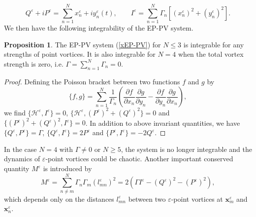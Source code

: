 \documentclass{article}
\theoremstyle{definition}
\newtheorem{proposition}[theorem]{Proposition}
\begin{document}
\begin{equation*}
Q^\varepsilon + i P^\varepsilon = \sum_{n = 1}^N x_n^\varepsilon + i y_n^\varepsilon(t), \qquad I^\varepsilon = \sum_{n = 1}^N \Gamma_n \left[ (x_n^\varepsilon)^2 + (y_n^\varepsilon)^2 \right].
\end{equation*}
We then have the following integrability of the EP-PV system.
\begin{proposition}
 The EP-PV system (\ref{xEP-PV}) for $N \leq 3$ is integrable for any strengths of point vortices. It is also integrable for $N = 4$ when the total vortex strength is zero, 
 i.e. $\Gamma = \sum_{n = 1}^N \Gamma_n = 0$.
\end{proposition}
\begin{proof}
Defining the Poisson bracket between two functions $f$ and $g$ by
\begin{equation*}
\{ f, g \} = \sum_{n = 1}^N \frac{1}{\Gamma_n} \left( \frac{\partial f}{\partial x_n}\frac{\partial g}{\partial y_n} - \frac{\partial f}{\partial y_n}\frac{\partial g}{\partial x_n} \right),
\end{equation*}
we find $\{ \mathscr{H}^\varepsilon, I^\varepsilon \} = 0$, $\{ \mathscr{H}^\varepsilon, (P^\varepsilon)^2 + (Q^\varepsilon)^2 \} = 0$ and $\{ (P^\varepsilon)^2 + (Q^\varepsilon)^2, I^\varepsilon \} = 0$.  In addition to above invariant quantities, we have $\{ Q^\varepsilon, P^\varepsilon \} = \Gamma$, $\{ Q^\varepsilon, I^\varepsilon \} = 2 P^\varepsilon$ and $\{ P^\varepsilon, I^\varepsilon \} = - 2 Q^\varepsilon$. 
\end{proof}
In the case $N = 4$ with $\Gamma \neq 0$ or $N \geq 5$, the system is no longer integrable and the dynamics of $\varepsilon$-point vortices could be chaotic. 
Another important conserved quantity $M^\varepsilon$ is introduced  by
\begin{equation*}
M^\varepsilon = \sum_{n \neq m}^N \Gamma_n \Gamma_m (l_{mn}^\varepsilon)^2 = 2 (\Gamma I^\varepsilon - (Q^\varepsilon)^2 - (P^\varepsilon)^2),
\end{equation*}
which depends only on the distances $l_{mn}^\varepsilon$ between two $\varepsilon$-point vortices at ${\bm x}_m^\varepsilon$ and ${\bm x}_n^\varepsilon$.








\end{document}
